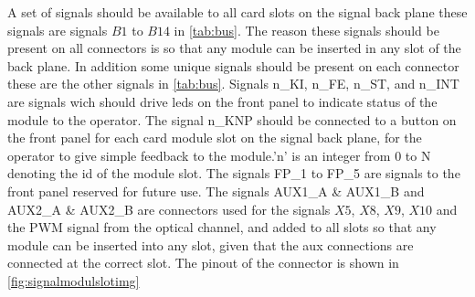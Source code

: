 A set of signals should be available to all card slots on the signal back plane these signals are signals $B1$ to $B14$ in \cref{tab:bus}. The reason these signals should be present on all connectors is so that any module can be inserted in any slot of the back plane. In addition some unique signals should be present on each connector these are the other signals in \cref{tab:bus}. Signals n\_KI, n\_FE, n\_ST, and n\_INT are signals wich should drive leds on the front panel to indicate status of the module to the operator. The signal n\_KNP should be connected to a button on the front panel for each card module slot on the signal back plane, for the operator to give simple feedback to the module.'n' is an integer from 0 to N denoting the id of the module slot. The signals FP\_1 to FP\_5 are signals to the front panel reserved for future use. The signals AUX1\_A \& AUX1\_B and AUX2\_A \& AUX2\_B are connectors used for the signals $X5$, $X8$, $X9$, $X10$ and the PWM signal from the optical channel, and added to all slots so that any module can be inserted into any slot, given that the aux connections are connected at the correct slot. The pinout of the connector is shown in \cref{fig:signalmodulslotimg}
